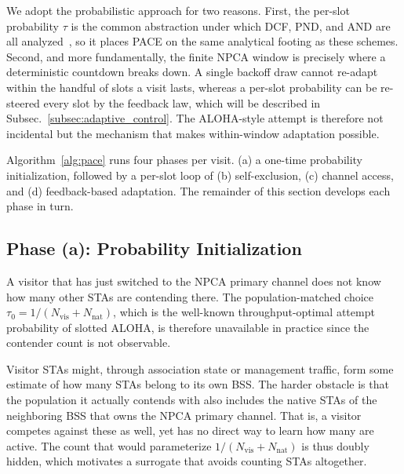 \documentclass[a4paper,fleqn]{cas-dc}
\newcommand{\Nvis}{N_\mathrm{vis}}
\newcommand{\Nnat}{N_\mathrm{nat}}
\begin{document}
We adopt the probabilistic approach for two reasons. First, the
per-slot probability $\tau$ is the common abstraction under which DCF, PND, and
AND are all analyzed~\citep{bianchi2000performance,song2014pnd,vasudevan2013efficient},
so it places PACE on the same analytical footing as these schemes.
Second, and more fundamentally, the finite NPCA window is precisely
where a deterministic countdown breaks down. A single backoff draw cannot
re-adapt within the handful of slots a visit lasts, whereas a per-slot
probability can be re-steered every slot by the feedback law, which will be described in Subsec.~\ref{subsec:adaptive_control}. The
ALOHA-style attempt is therefore not incidental but the mechanism that makes
within-window adaptation possible.

Algorithm~\ref{alg:pace} runs four phases per visit. (a) a one-time probability
initialization, followed by a per-slot loop of (b) self-exclusion, (c) channel
access, and (d) feedback-based adaptation. The remainder of this section develops
each phase in turn.

\subsection{Phase (a): Probability Initialization}
\label{subsec:init}

A visitor that has just switched to the NPCA primary channel does not know how
many other STAs are contending there. The population-matched choice
$\tau_0=1/(\Nvis{+}\Nnat)$, which is the well-known throughput-optimal attempt probability of
slotted ALOHA, is therefore unavailable in practice since the contender count is not observable.

Visitor STAs might, through association state or management traffic, form some
estimate of how many STAs belong to its own BSS. The harder obstacle is that
the population it actually contends with also includes the native STAs of the
neighboring BSS that owns the NPCA primary channel. That is, a visitor competes against these as well, yet has no direct way to learn how many are active. The count that would
parameterize $1/(\Nvis{+}\Nnat)$ is thus doubly hidden, which motivates a surrogate that
avoids counting STAs altogether.
\end{document}

